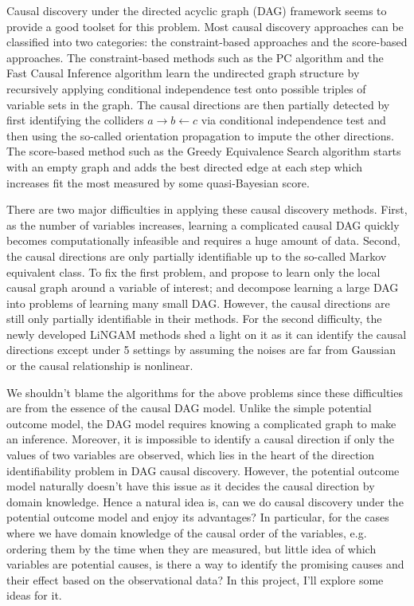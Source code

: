 \documentclass[11pt]{article}
\begin{document}

Causal discovery under the directed acyclic graph (DAG) framework seems to provide a good toolset for this problem. Most causal discovery approaches can be classified into two categories: the constraint-based approaches and the score-based approaches. The constraint-based methods such as the PC algorithm and the Fast Causal Inference algorithm \citep{spirtes2000causation} learn the undirected graph structure by recursively applying conditional independence test onto possible triples of variable sets in the graph. The causal directions are then partially detected by first identifying the colliders $a \rightarrow b \leftarrow c$ via conditional independence test and then using the so-called orientation propagation to impute the other directions. The score-based method such as the Greedy Equivalence Search algorithm \citep{chickering2002optimal} starts with an empty graph and adds the best directed edge at each step which increases fit the most measured by some quasi-Bayesian score.

There are two major difficulties in applying these causal discovery methods. First, as the number of variables increases, learning a complicated causal DAG quickly becomes computationally infeasible and requires a huge amount of data. Second, the causal directions are only partially identifiable up to the so-called Markov equivalent class. To fix the first problem, \citet{wang2013discovering} and \citet{wang2014discovering} propose to learn only the local causal graph around a variable of interest; \citet{xie2008recursive} and \citet{xie2006decomposition} decompose learning a large DAG into problems of learning many small DAG. However, the causal directions are still only partially identifiable in their methods. For the second difficulty, the newly developed LiNGAM methods \citep{shimizu2006linear,shimizu2011directlingam} shed a light on it as it can identify the causal directions except under 5 settings by assuming the noises are far from Gaussian or the causal relationship is nonlinear.

We shouldn't blame the algorithms for the above problems since these difficulties are from the essence of the causal DAG model. Unlike the simple potential outcome model, the DAG model requires knowing a complicated graph to make an inference. Moreover, it is impossible to identify a causal direction if only the values of two variables are observed, which lies in the heart of the direction identifiability problem in DAG causal discovery. However, the potential outcome model naturally doesn't have this issue as it decides the causal direction by domain knowledge. Hence a natural idea is, can we do causal discovery under the potential outcome model and enjoy its advantages? In particular, for the cases where we have domain knowledge of the causal order of the variables, e.g. ordering them by the time when they are measured, but little idea of which variables are potential causes, is there a way to identify the promising causes and their effect based on the observational data? In this project, I'll explore some ideas for it.
\end{document}
